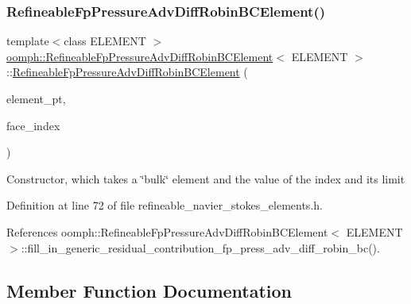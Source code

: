 \subsubsection{\texorpdfstring{Refineable\+Fp\+Pressure\+Adv\+Diff\+Robin\+B\+C\+Element()}{RefineableFpPressureAdvDiffRobinBCElement()}}
{\footnotesize\ttfamily template$<$class E\+L\+E\+M\+E\+NT $>$ \\
\hyperlink{classoomph_1_1RefineableFpPressureAdvDiffRobinBCElement}{oomph\+::\+Refineable\+Fp\+Pressure\+Adv\+Diff\+Robin\+B\+C\+Element}$<$ E\+L\+E\+M\+E\+NT $>$\+::\hyperlink{classoomph_1_1RefineableFpPressureAdvDiffRobinBCElement}{Refineable\+Fp\+Pressure\+Adv\+Diff\+Robin\+B\+C\+Element} (\begin{DoxyParamCaption}\item[{\hyperlink{classoomph_1_1FiniteElement}{Finite\+Element} $\ast$const \&}]{element\+\_\+pt,  }\item[{const int \&}]{face\+\_\+index }\end{DoxyParamCaption})\hspace{0.3cm}{\ttfamily [inline]}}

Constructor, which takes a \char`\"{}bulk\char`\"{} element and the value of the index and its limit 

Definition at line 72 of file refineable\+\_\+navier\+\_\+stokes\+\_\+elements.\+h.



References oomph\+::\+Refineable\+Fp\+Pressure\+Adv\+Diff\+Robin\+B\+C\+Element$<$ E\+L\+E\+M\+E\+N\+T $>$\+::fill\+\_\+in\+\_\+generic\+\_\+residual\+\_\+contribution\+\_\+fp\+\_\+press\+\_\+adv\+\_\+diff\+\_\+robin\+\_\+bc().



\subsection{Member Function Documentation}
\mbox{\label{classoomph_1_1RefineableFpPressureAdvDiffRobinBCElement_ae1c6ebf08fa0aa27847b963cb3bcd581}} 
